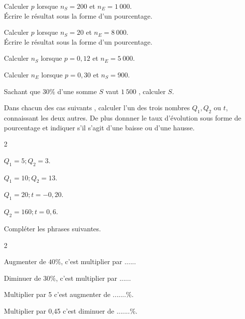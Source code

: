 \documentclass[11pt,a4paper]{article}  %
\begin{document}
\begin{enumMet}
	\item Calculer $p$ lorsque $n_S = 200$ et $n_E = 1\ 000$.\\
	Écrire le résultat sous la forme d'un pourcentage.
	\item Calculer $p$ lorsque $n_S = 20$ et $n_E= 8\ 000$.\\
	Écrire le résultat sous la forme d'un pourcentage.
	\item Calculer $n_S$ lorsque $p = 0,12$ et $n_E= 5\ 000$.
	\item Calculer $n_E$ lorsque $p = 0,30$ et $n_S = 900$.
	\item Sachant que $30 \%$ d'une somme $S$ vaut $1\ 500$ \EUR{}, calculer $S$.
\end{enumMet}

Dans chacun des cas suivants , calculer l'un des trois nombres $Q_{1}, Q_{2}$ ou $t$, connaissant les deux autres. De plus donnner le taux d'évolution sous forme de pourcentage et indiquer s'il s'agit d'une baisse ou d'une hausse.
	\begin{multicols}{2}
		\begin{enumMet}
		\item $Q_{1}=5 ; Q_{2}=3$.
		\item $Q_{1}=10 ; Q_{2}=13$.
		\item $Q_{1}=20 ; t=-0,20$.
		\item $Q_{2}=160 ; t=0,6$.
	\end{enumMet}
	\end{multicols}


Compléter les phrases suivantes.
\begin{multicols}{2}
	\begin{enumMet}
	\item Augmenter de $40 \%$, c'est multiplier par ......
	\item Diminuer de $30 \%$, c'est multiplier par ......
	\item Multiplier par 5 c'est augmenter de .......\%.
	\item Multiplier par 0,45 c'est diminuer de .......\%.	
\end{enumMet}
\end{multicols}
\end{document}
